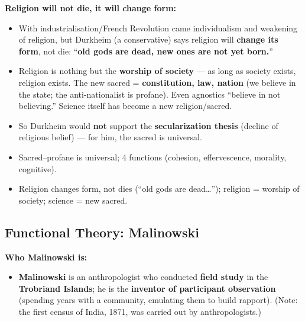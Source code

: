 \begin{CriticalPoint}
\textbf{Religion will not die, it will change form:}
\begin{itemize}
\item With industrialisation/French Revolution came individualism and weakening of religion, but Durkheim (a conservative) says religion will \textbf{change its form}, not die: ``\textbf{old gods are dead, new ones are not yet born.}''
\item Religion is nothing but the \textbf{worship of society} --- as long as society exists, religion exists. The new sacred = \textbf{constitution, law, nation} (we believe in the state; the anti-nationalist is profane). Even agnostics ``believe in not believing.'' Science itself has become a new religion/sacred.
\item So Durkheim would \textbf{not} support the \textbf{secularization thesis} (decline of religious belief) --- for him, the sacred is universal.
\end{itemize}
\end{CriticalPoint}

\begin{QuickRevision}
\begin{itemize}
\item Sacred--profane is universal; 4 functions (cohesion, effervescence, morality, cognitive).
\item Religion changes form, not dies (``old gods are dead\dots''); religion = worship of society; science = new sacred.
\end{itemize}
\end{QuickRevision}

\sectiondivider

\subsection{Functional Theory: Malinowski}

\begin{DataFact}
\textbf{Who Malinowski is:}
\begin{itemize}
\item \textbf{Malinowski} is an anthropologist who conducted \textbf{field study} in the \textbf{Trobriand Islands}; he is the \textbf{inventor of participant observation} (spending years with a community, emulating them to build rapport). (Note: the first census of India, 1871, was carried out by anthropologists.)
\end{itemize}
\end{DataFact}

